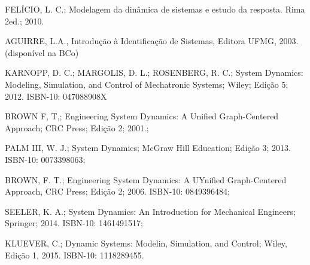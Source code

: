 {{    FELÍCIO, L. C.; Modelagem da dinâmica de sistemas e estudo da resposta. Rima 2ed.; 2010.

    AGUIRRE, L.A., Introdução à Identificação de Sistemas, Editora UFMG, 2003. (disponível na BCo)

        KARNOPP, D. C.; MARGOLIS, D. L.; ROSENBERG, R. C.; System Dynamics: Modeling, Simulation, and Control of Mechatronic Systems; Wiley; Edição 5; 2012. ISBN-10: 047088908X

    BROWN F, T,; Engineering System Dynamics: A Unified Graph-Centered Approach; CRC Press; Edição 2; 2001.;

    PALM III, W. J.; System Dynamics; McGraw Hill Education; Edição 3; 2013. ISBN-10: 0073398063;

    BROWN, F. T.; Engineering System Dynamics: A UYnified Graph-Centered Approach, CRC Press; Edição 2;
    2006. ISBN-10: 0849396484;

    SEELER, K. A.; System Dynamics: An Introduction for Mechanical Engineers; Springer; 2014. ISBN-10: 1461491517;

    KLUEVER, C.; Dynamic Systems: Modelin, Simulation, and Control; Wiley, Edição 1, 2015. ISBN-10: 1118289455.
    }
    
}
